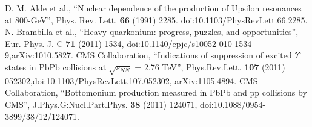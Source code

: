 \begin{thebibliography}{999}
 D. M. Alde et al., ``Nuclear dependence of the production of Upsilon resonances at
800-GeV'', Phys. Rev. Lett. {\bf 66} (1991) 2285. doi:10.1103/PhysRevLett.66.2285.
 N. Brambilla et al., ``Heavy quarkonium: progress, puzzles, and opportunities'', Eur.
Phys. J. C {\bf 71} (2011) 1534, doi:10.1140/epjc/s10052-010-1534-9,arXiv:1010.5827.
 CMS Collaboration, ``Indications of suppression of excited $\Upsilon$ states in PbPb collisions at $\sqrt{s_{NN}}$ = 2.76 TeV'', 
Phys.Rev.Lett. {\bf 107} (2011) 052302,doi:10.1103/PhysRevLett.107.052302, arXiv:1105.4894.
 CMS Collaboration, ``Bottomonium production measured in PbPb and pp collisions by CMS'', J.Phys.G:Nucl.Part.Phys. {\bf 38} (2011) 124071,
doi:10.1088/0954-3899/38/12/124071.




















































\end{thebibliography}

